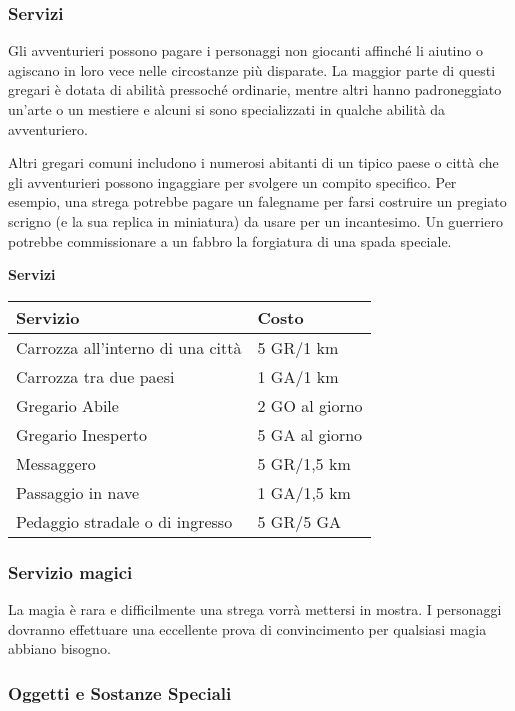 \documentclass[12pt,a4paper,twoside,openany]{book}
\begin{document}
\begin{multicols}{2}


\subsubsection{Servizi}

Gli avventurieri possono pagare i personaggi non giocanti affinché li aiutino o agiscano in loro vece nelle circostanze più disparate. La maggior parte di questi gregari è dotata di abilità pressoché ordinarie, mentre altri hanno padroneggiato un'arte o un mestiere e alcuni si sono specializzati in qualche abilità da avventuriero.

Altri gregari comuni includono i numerosi abitanti di un tipico paese o città che gli avventurieri possono ingaggiare per svolgere un compito specifico. Per esempio, una strega potrebbe pagare un falegname per farsi costruire un pregiato scrigno (e la sua replica in miniatura) da usare per un incantesimo.
Un guerriero potrebbe commissionare a un fabbro la forgiatura di una spada speciale.

\medskip

\textbf{Servizi}

\bigskip

\begin{tabularx}{0.45\textwidth}{Xl}
\textbf{Servizio}&\textbf{Costo}\\
\toprule
Carrozza all'interno di una città&5 GR/1 km\\
Carrozza tra due paesi&1 GA/1 km\\
Gregario Abile&2 GO al giorno\\
Gregario Inesperto&5 GA al giorno\\
Messaggero&5 GR/1,5 km\\
Passaggio in nave&1 GA/1,5 km\\
Pedaggio stradale o di ingresso&5 GR/5 GA\\
\end{tabularx}


\subsubsection{Servizio magici}


La magia è rara e difficilmente una strega vorrà mettersi in mostra.
I personaggi dovranno effettuare una eccellente prova di convincimento per qualsiasi magia abbiano bisogno.

\subsubsection{Oggetti e Sostanze Speciali}


\end{multicols}
\end{document}
